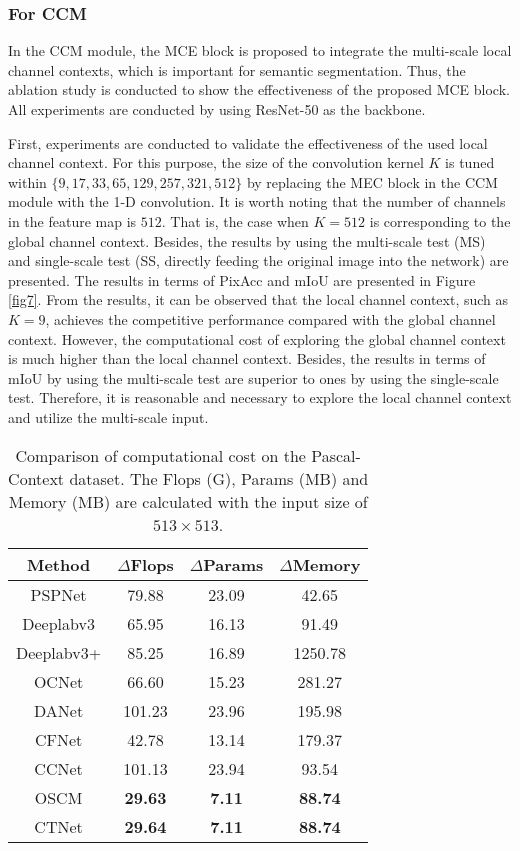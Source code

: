 \documentclass[10pt,journal,cspaper,compsoc]{IEEEtran}
\begin{document}
\subsubsection{For CCM}
In the CCM module, the MCE block is proposed to integrate the multi-scale local channel contexts, which is important for semantic segmentation. Thus, the ablation study is conducted to show the effectiveness of the proposed MCE block. All experiments are conducted by using ResNet-50 as the backbone.

First, experiments are conducted to validate the effectiveness of the used local channel context. For this purpose, the size of the convolution kernel $K$ is tuned within $\{9, 17, 33, 65, 129, 257, 321, 512\}$ by replacing the MEC block in the CCM module with the 1-D convolution. It is worth noting that the number of channels in the feature map is $512$. That is, the case when $K=512$ is corresponding to the global channel context. Besides, the results by using the multi-scale test (MS) and single-scale test (SS, directly feeding the original image into the network) are presented. The results in terms of PixAcc and mIoU are presented in Figure \ref{fig7}. From the results, it can be observed that the local channel context, such as $K=9$, achieves the competitive performance compared with the global channel context. However, the computational cost of exploring the global channel context is much higher than the local channel context. Besides, the results in terms of mIoU by using the multi-scale test are superior to ones by using the single-scale test. Therefore, it is reasonable and necessary to explore the local channel context and utilize the multi-scale input.
	
\begin{table}[t]
\caption{Comparison of computational cost on the Pascal-Context dataset. The Flops (G), Params (MB) and Memory (MB) are calculated with the input size of $513 \times 513$. }
\label{table3}
		\renewcommand\arraystretch{1.3}
		\centering
		\begin{tabular}{c|c|c|c}
			\hline
			Method &$\Delta$Flops&$\Delta$Params &$\Delta$Memory\\
			\hline
			PSPNet \cite{zhao2017pyramid}  & 79.88&23.09 &42.65\\
			Deeplabv3 \cite{chen2017rethinking}& 65.95& 16.13&91.49\\
			Deeplabv3+ \cite{chen2018encoder} & 85.25& 16.89&1250.78\\
			\hline
			OCNet \cite{yu2020context} &66.60&15.23&281.27 \\
			DANet \cite{fu2019dual}&  101.23 &23.96& 195.98\\
			CFNet \cite{zhang2019co} & 42.78 & 13.14& 179.37\\
			CCNet \cite{huang2019ccnet}& 101.13 & 23.94 & 93.54\\
			\hline
			OSCM &\textbf{29.63}&\textbf{7.11}&\textbf{88.74}\\
			CTNet &\textbf{29.64} & \textbf{7.11}& \textbf{88.74}\\
			\hline
	\end{tabular}
\end{table}
	
\end{document}
